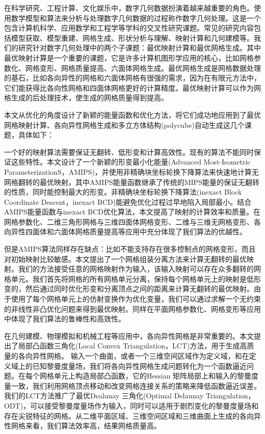 ﻿\begin{cnabstract}
在科学研究、工程计算、文化娱乐中，数字几何数据扮演着越来越重要的角色。使用数学模型和算法来分析与处理数字几何数据的过程称作数字几何处理。这是一个包含计算机科学、应用数学和工程学等学科的交叉性研究课题。常见的研究内容包括模型获取、模型重建、网格生成、形状分析与理解、映射计算和几何建模等。我们的研究针对数字几何处理中的两个子课题：最优映射计算和最优网格生成。其中最优映射计算是一个重要的课题，它是许多计算机图形学应用的核心，比如网格参数化、网格变形、网格质量提高、六面体网格生成。最优网格生成是网格数据处理的基石，比如各向异性的网格和六面体网格有很强的需求，因为在有限元方法中，它们能获得比各向性网格和四面体网格更好的计算精度。最优映射计算可以作为网格生成的后处理技术，使生成的网格质量得到提高。

本文从优化的角度设计了新颖的能量函数和优化方法，将它们成功地应用到了最优网格映射计算、各向异性网格生成和多立方体结构(polycube)自动生成这几个课题，具体如下：

一个好的映射算法需要保证无翻转、低形变和计算高效性。现有的算法不能同时保证这些特性。本文设计了一个新颖的形变最小化能量(Advanced Most-Isometric ParameterizationS，AMIPS)，并使用非精确块坐标轮换下降算法来快速地计算无网格翻转的最优映射。其中AMIPS能量函数继承了传统的MIPS能量的保证无翻转的性质，同时能控制最大的形变。非精确块坐标轮换下降算法(inexact Block Coordinate Descent，inexact BCD)能避免优化过程过早地陷入局部最小。结合AMIPS能量函数与inexact BCD优化算法，本文提高了映射的计算效率和质量。在网格参数化、二维三角形网格与三维四面体网格变形、二维与三维无网格变形、各向异性四面体和六面体网格质量提高等应用中充分体现了我们算法的优越性。

但是AMIPS算法同样存在缺点：比如不能支持存在很多控制点的网格变形，而且对初始映射比较敏感。本文提出了一个网格组装分离方法来计算无翻转的最优映射。我们的方法接受任意的网格映射作为输入，该输入映射可以存在众多翻转的网格单元。我们首先将网格的所有网格单元分离，保持每个网格单元上的映射是低形变的，然后通过同时优化形变和分离顶点之间的距离来计算无翻转的最优映射。由于使用了每个网格单元上的仿射变换作为优化变量，我们可以通过求解一个无约束的非线性非凸优化问题来得到最优映射。同样在平面网格参数化、网格变形等应用中体现了我们算法的鲁棒性和高效性。

在几何建模、物理模拟和机械工程等应用中，各向异性网格是非常重要的。本文提出了局部凸函数三角化(Local Convex Triangulation，LCT)方法，用于生成高质量的各向异性网格。 输入一个曲面，或者一个三维空间区域作为定义域，和在定义域上的已知黎曼度量场，我们将各向异性网格生成问题转化为一个函数逼近问题。在每个网格单元上构造局部凸函数，它的Hessian 矩阵局部上和输入的黎曼度量一致，我们利用网格顶点移动和改变网格连接关系的策略来降低函数逼近误差。我们的LCT方法推广了最优Dealunay 三角化(Optimal Delaunay Triangulation，ODT)，可以接受黎曼度量场作为输入，同时可以适用于剧烈变化的黎曼度量场和存在尖锐特征的网格。从二维平面区域、三维空间区域和三维曲面上生成的各向异性网格来看，我们算法效率高，结果网格质量高。


\end{cnabstract}
